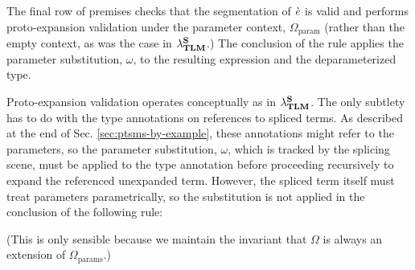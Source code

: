 \documentclass[acmsmall,review,anonymous]{acmart}\settopmatter{printfolios=true,printccs=false,printacmref=false}
\begin{document}
The final row of premises checks that the segmentation of $\ce$ is valid and  performs proto-expansion validation under the parameter context, $\Omega_\text{param}$ (rather than the empty context, as was the case in $\miniVersePat$.) The conclusion of the rule applies the parameter substitution, $\omega$, to the resulting expression and the deparameterized type.

Proto-expansion validation operates conceptually as in $\miniVersePat$. The only subtlety has to do with the type annotations on references to spliced terms. As described at the end of Sec. \ref{sec:ptsms-by-example}, these annotations might refer to the parameters, so the parameter substitution, $\omega$, which is tracked by the splicing scene, must be applied to the type annotation before proceeding recursively to expand the referenced unexpanded term. However, the spliced term itself must treat parameters parametrically, so the substitution is not applied in the conclusion of the following rule:
\begin{mathpar}\label{rule:cvalidE-P-splicede}
\end{mathpar}
(This is only sensible because we maintain the invariant that $\Omega$ is always an extension of $\Omega_\text{params}$.)
\end{document}
